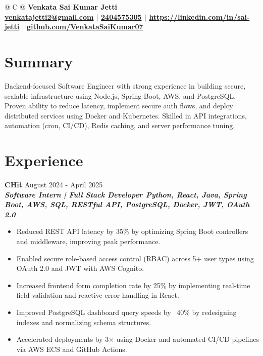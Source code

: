 \documentclass[a4paper,11pt]{article}
\begin{document}
\pagestyle{empty}



\begin{tabularx}{\linewidth}{@{} C @{}}
\color{myteal} \LARGE\bfseries{Venkata Sai Kumar Jetti}\\[8pt]
{\href{mailto:venkatajetti2@gmail.com}{venkatajetti2@gmail.com} $|$}
{\href{tel:2404575305}{2404575305} $|$}
{\href{https://linkedin.com/in/sai-jetti}{https://linkedin.com/in/sai-jetti} $|$}
{\href{https://github.com/VenkataSaiKumar07}{github.com/VenkataSaiKumar07}}
\end{tabularx}

\section{Summary}
\vspace{1pt}
Backend-focused Software Engineer with strong experience in building secure, scalable infrastructure using Node.js, Spring Boot, AWS, and PostgreSQL. Proven ability to reduce latency, implement secure auth flows, and deploy distributed services using Docker and Kubernetes. Skilled in API integrations, automation (cron, CI/CD), Redis caching, and server performance tuning.


\section{Experience}
\textbf{CHit} \hfill August 2024 - April 2025\\[1pt]
\textbf{\textit{Software Intern | Full Stack Developer}}\ \hfill \textbf{\textit{Python, React, Java, Spring Boot, AWS, SQL, RESTful API, PostgreSQL, Docker, JWT, OAuth 2.0}}\vspace{-5pt}
\begin{itemize}[nosep, after=\strut, leftmargin=1em, itemsep=0.8pt]
    \item Reduced REST API latency by 35\% by optimizing Spring Boot controllers and middleware, improving peak performance.
    \item Enabled secure role-based access control (RBAC) across 5+ user types using OAuth 2.0 and JWT with AWS Cognito.
    \item Increased frontend form completion rate by 25\% by implementing real-time field validation and reactive error handling in React.
    \item Improved PostgreSQL dashboard query speeds by ~40\% by redesigning indexes and normalizing schema structures.
    \item Accelerated deployments by 3× using Docker and automated CI/CD pipelines via AWS ECS and GitHub Actions.
    \end{itemize}
\end{document}
